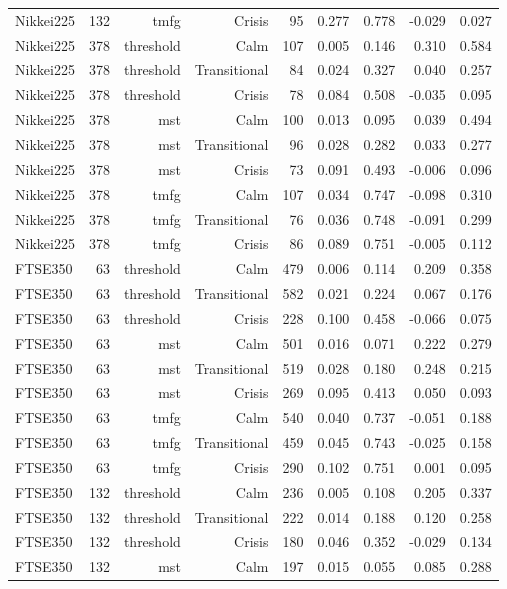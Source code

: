 \begin{tabular}{lrrrrrrrr}
Nikkei225 & 132 & tmfg & Crisis & 95 & 0.277 & 0.778 & -0.029 & 0.027 \\
Nikkei225 & 378 & threshold & Calm & 107 & 0.005 & 0.146 & 0.310 & 0.584 \\
Nikkei225 & 378 & threshold & Transitional & 84 & 0.024 & 0.327 & 0.040 & 0.257 \\
Nikkei225 & 378 & threshold & Crisis & 78 & 0.084 & 0.508 & -0.035 & 0.095 \\
Nikkei225 & 378 & mst & Calm & 100 & 0.013 & 0.095 & 0.039 & 0.494 \\
Nikkei225 & 378 & mst & Transitional & 96 & 0.028 & 0.282 & 0.033 & 0.277 \\
Nikkei225 & 378 & mst & Crisis & 73 & 0.091 & 0.493 & -0.006 & 0.096 \\
Nikkei225 & 378 & tmfg & Calm & 107 & 0.034 & 0.747 & -0.098 & 0.310 \\
Nikkei225 & 378 & tmfg & Transitional & 76 & 0.036 & 0.748 & -0.091 & 0.299 \\
Nikkei225 & 378 & tmfg & Crisis & 86 & 0.089 & 0.751 & -0.005 & 0.112 \\
FTSE350 & 63 & threshold & Calm & 479 & 0.006 & 0.114 & 0.209 & 0.358 \\
FTSE350 & 63 & threshold & Transitional & 582 & 0.021 & 0.224 & 0.067 & 0.176 \\
FTSE350 & 63 & threshold & Crisis & 228 & 0.100 & 0.458 & -0.066 & 0.075 \\
FTSE350 & 63 & mst & Calm & 501 & 0.016 & 0.071 & 0.222 & 0.279 \\
FTSE350 & 63 & mst & Transitional & 519 & 0.028 & 0.180 & 0.248 & 0.215 \\
FTSE350 & 63 & mst & Crisis & 269 & 0.095 & 0.413 & 0.050 & 0.093 \\
FTSE350 & 63 & tmfg & Calm & 540 & 0.040 & 0.737 & -0.051 & 0.188 \\
FTSE350 & 63 & tmfg & Transitional & 459 & 0.045 & 0.743 & -0.025 & 0.158 \\
FTSE350 & 63 & tmfg & Crisis & 290 & 0.102 & 0.751 & 0.001 & 0.095 \\
FTSE350 & 132 & threshold & Calm & 236 & 0.005 & 0.108 & 0.205 & 0.337 \\
FTSE350 & 132 & threshold & Transitional & 222 & 0.014 & 0.188 & 0.120 & 0.258 \\
FTSE350 & 132 & threshold & Crisis & 180 & 0.046 & 0.352 & -0.029 & 0.134 \\
FTSE350 & 132 & mst & Calm & 197 & 0.015 & 0.055 & 0.085 & 0.288 \\

\end{tabular}
